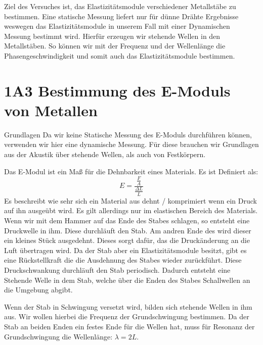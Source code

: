 \documentclass[twoside]{protokoll}
\begin{document}
\begin{versuchsziele}
Ziel des Versuches ist, das Elastizitätsmodule verschiedener Metallstäbe zu bestimmen.
Eine statische Messung liefert nur für dünne Drähte Ergebnisse weswegen das Elastizitätsmodule in unserem Fall mit einer Dynamischen Messung bestimmt wird. Hierfür erzeugen wir stehende Wellen in den Metallstäben. So können wir mit der Frequenz und der Wellenlänge die Phasengeschwindigkeit und somit auch das Elastizitätsmodule bestimmen. 
\end{versuchsziele}

 
\section{1A3 Bestimmung des E-Moduls von Metallen}


\begin{aufgabe}{Grundlagen}
    Da wir keine Statische Messung des E-Moduls durchführen können, verwenden wir hier eine dynamische Messung.
    Für diese brauchen wir Grundlagen aus der Akustik über stehende Wellen, als auch von Festkörpern.


    Das E-Modul ist ein Maß für die Dehnbarkeit eines Materials. Es ist Definiert als: 
    \begin{equation}
        E = \frac{\frac{F}{A}}{\frac{\Delta L}{L}}
    \end{equation}
    Es beschreibt wie sehr sich ein Material aus dehnt / komprimiert wenn ein Druck auf ihn ausgeübt wird.
    Es gilt allerdings nur im elastischen Bereich des Materials.\\
    
    Wenn wir mit dem Hammer auf das Ende des Stabes schlagen, so entsteht eine Druckwelle in ihm.
    Diese durchläuft den Stab. Am andren Ende des wird dieser ein kleines Stück ausgedehnt.
    Dieses sorgt dafür, das die Druckänderung an die Luft übertragen wird.
    Da der Stab aber ein Elastizitätsmodule besitzt, gibt es eine Rückstellkraft die die Ausdehnung des Stabes wieder zurückführt.
    Diese Druckschwankung durchläuft den Stab periodisch.
    Dadurch entsteht eine Stehende Welle in dem Stab, welche über die Enden des Stabes Schallwellen an die Umgebung abgibt.

    Wenn der Stab in Schwingung versetzt wird, bilden sich stehende Wellen in ihm aus.
    Wir wollen hierbei die Frequenz der Grundschwingung bestimmen.
    Da der Stab an beiden Enden ein festes Ende für die Wellen hat, muss für Resonanz der Grundschwingung die Wellenlänge: $\lambda = 2 L$. 
     

\end{aufgabe}
\end{document}
